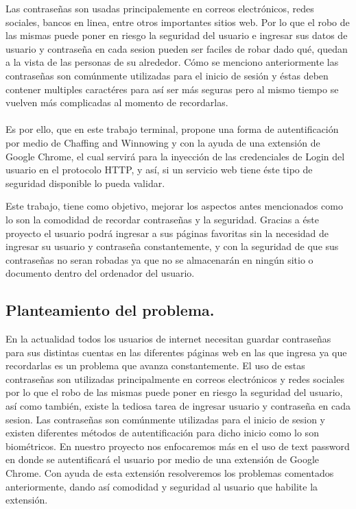 \documentclass[12pt, a4paper, titlepage]{article}
\begin{document}
		Las contraseñas son usadas principalemente en correos electrónicos, redes sociales, bancos en linea, entre otros importantes sitios web. Por lo que el robo de las mismas puede poner en riesgo la seguridad del usuario e ingresar sus datos de usuario y contraseña en cada sesion pueden ser faciles de robar dado qué, quedan a la vista de las personas de su alrededor.
		Cómo se menciono anteriormente las contraseñas son comúnmente utilizadas para el inicio de sesión y éstas deben contener multiples caractéres para así ser más seguras pero al mismo tiempo se vuelven más complicadas al momento de recordarlas. 
		
		\paragraph {}
		Es por ello, que en este trabajo terminal, propone una forma de autentificación por medio de Chaffing and Winnowing y con la ayuda de una extensión de Google Chrome, el cual servirá para la inyección de las credenciales de Login del usuario en el protocolo HTTP, y así, si un servicio web tiene éste tipo de seguridad disponible lo pueda validar. 
		
		Este trabajo, tiene como objetivo, mejorar los aspectos antes mencionados como lo son la comodidad de recordar contraseñas y la seguridad. Gracias a éste proyecto el usuario podrá ingresar a sus páginas favoritas sin la necesidad de ingresar su usuario y contraseña constantemente, y con la seguridad de que sus contraseñas no seran robadas ya que no se almacenarán en ningún sitio o documento dentro del ordenador del usuario.
		
		
		\newpage
		\subsection{Planteamiento del problema.}
			En la actualidad todos los usuarios de internet necesitan guardar contraseñas para sus distintas cuentas en las diferentes páginas web en las que ingresa ya que recordarlas es un problema que avanza constantemente. El uso de estas contraseñas son utilizadas principalmente en correos electrónicos y redes sociales por lo que el robo de las mismas puede poner en riesgo la seguridad del usuario, así como también, existe la tediosa tarea de ingresar usuario y contraseña en cada sesion. Las contraseñas son comúnmente utilizadas para el inicio de sesion y existen diferentes métodos de autentificación para dicho inicio como lo son biométricos. En nuestro proyecto nos enfocaremos más en el uso de text password en donde se autentificará el usuario por medio de una extensión de Google Chrome. Con ayuda de esta extensión resolveremos los problemas comentados anteriormente, dando así comodidad y seguridad al usuario que habilite la extensión.
		    
\end{document}
